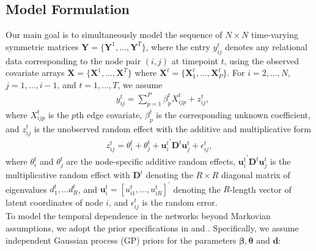 \documentclass[a4paper]{article}
\begin{document}
\subsection{Model Formulation}\label{subsec: Model formulation}
Our main goal is to simultaneously model the sequence of $N \times N$ time-varying symmetric matrices $\mathbf{Y} = \{\mathbf{Y} ^1,\ldots,\mathbf{Y}^T\}$, where the entry $y^t_{ij}$ denotes any relational data corresponding to the node pair $(i, j)$ at timepoint $t$, using the observed covariate arrays $\mathbf{X} = \{\mathbf{X} ^1,\ldots,\mathbf{X} ^T\}$ where $\mathbf{X} ^t = \{\mathbf{X}^t_1, \ldots, \mathbf{X}^t_P\}$. For $i=2,\ldots,N$,$j=1,\ldots,i-1$, and $t = 1,\ldots,T$, we assume
\begin{equation}
\begin{aligned}
&y^t_{ij}=\sum\limits_{p=1}^P \beta^t_{p}X^t_{ijp}+z^t_{ij},
\end{aligned}
\end{equation}
where $X^t_{ijp}$ is the $p${th} edge covariate, $\beta^t_{p}$ is the corresponding unknown coefficient, and $z^t_{ij}$ is the unobserved random effect with the additive and multiplicative form
\begin{equation}
\begin{aligned}
z^t_{ij} = \theta^t_{i}+\theta^t_{j}+{{\boldsymbol{u}^t_{i}}^\prime \mathbf{D}^{t} \boldsymbol{u}^t_{j}}+\epsilon^t_{ij},
\end{aligned}
\end{equation}
where $\theta^t_{i}$ and $\theta^t_{j}$ are the node-specific additive random effects, ${{\boldsymbol{u}^t_{i}}^\prime \mathbf{D}^{t} \boldsymbol{u}^t_{j}}$ is the multiplicative random effect with $\mathbf{D}^{t}$ denoting the $R\times R$ diagonal matrix of eigenvalues $d^t_1,\ldots d^t_R$, and $\boldsymbol{u}^t_{i}=[u^t_{i1},\ldots,u^t_{iR}]^\prime$ denoting the $R$-length vector of latent coordinates of node $i$, and $\epsilon^t_{ij}$ is the random error.\\ \newline
To model the temporal dependence in the networks beyond Markovian assumptions, we adopt the prior specifications in \cite{bhattacharya2011sparse} and \cite{durante2013nonparametric}. Specifically, we assume independent Gaussian process (GP) priors for the parameters $\boldsymbol{\beta}, \boldsymbol{\theta}$ and  $\boldsymbol{d}$: 
\end{document}
